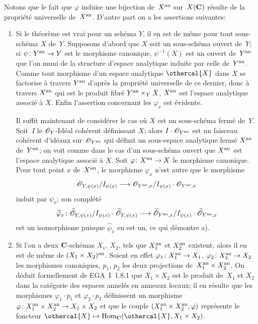 Notons que le fait que $\varphi$ induise une bijection de~$X^{\mathrm{an}}$ sur~$X(\mathbf{C})$ r\'esulte de la propri\'et\'e universelle de~$X^{\mathrm{an}}$.
D'autre part on a les assertions suivantes:

\begin{enumerate}
\item [a)] Si le th\'eor\`eme est vrai pour un sch\'ema $Y$, il
en est de m\^eme pour tout sous-sch\'ema $X$ de~$Y$. Supposons
d'abord que $X$ soit un sous-sch\'ema ouvert de~$Y$; si $\psi\colon
Y^\an\to Y$ est le morphisme canonique, $\psi^{-1}(X)$ est un ouvert
de~$Y^{\mathrm{an}}$ que l'on muni de la structure d'espace analytique induite
par celle de~$Y^{\mathrm{an}}$. Comme tout morphisme d'un espace analytique
$\othercal{X}$ dans $X$ se factorise \`a travers $Y^{\mathrm{an}}$ d'apr\`es la
propri\'et\'e universelle de ce dernier, donc \`a travers
$X^{\mathrm{an}}$ qui est le produit fibr\'e $Y^{\mathrm{an}}\times_Y X$, $X^{\mathrm{an}}$ est
l'espace analytique associ\'e \`a $X$. Enfin l'assertion
concernant les $\varphi_x$ est \'evidente.

Il suffit maintenant de consid\'erer le cas o\`u $X$ est un
sous-sch\'ema ferm\'e de~$Y$. Soit~$I$ le $\cal{O}_Y$-Id\'eal
coh\'erent d\'efinissant $X$; alors $I\cdot\cal{O}_{Y^\an}$ est un
faisceau coh\'erent d'id\'eaux sur~$\cal{O}_{Y^\an}$ qui
d\'efinit un sous-espace analytique ferm\'e $X^{\mathrm{an}}$ de~$Y^{\mathrm{an}}$; on
voit comme dans le cas d'un sous-sch\'ema ouvert que $X^{\mathrm{an}}$ est
l'espace analytique associ\'e \`a $X$. Soit $\varphi\colon
X^\an\to X$ le morphisme canonique. Pour tout point $x$ de~$X^{\mathrm{an}}$, le
morphisme $\varphi_x$ n'est autre que le morphisme
$$
\cal{O}_{Y,\psi(x)}/I_{\psi(x)}\to
\cal{O}_{Y^\an,x}/I_{\psi(x)}\cdot\cal{O}_{Y^\an,x}
$$
induit par $\psi_x$; son compl\'et\'e
$$
\widehat{\varphi}_x\colon
\widehat{\cal{O}}_{Y,\psi(x)}/I_{\psi(x)}\cdot\widehat{\cal{O}}_{Y,\psi(x)}
\to\widehat{\cal{O}}_{Y^\an,x}/I_{\psi(x)}\cdot\widehat{\cal{O}}_{Y^\an,x}
$$
est un isomorphisme puisque $\widehat\psi_x$ en est un, ce qui
d\'emontre a).

\item [b)] Si l'on a deux $\mathbf{C}$-sch\'emas $X_1$, $X_2$, tels que
$X_1^{\mathrm{an}}$ et $X_2^{\mathrm{an}}$ existent, alors il en est de m\^eme de
$(X_1\times X_2)^{\mathrm{an}}$. Soient en effet $\varphi_1\colon X_1^\an\to
X_1$, $\varphi_2\colon X_2^\an\to X_2$ les morphismes canoniques,
$p_1$, $p_2$ les deux projections de~$X_1^{\mathrm{an}}\times X_2^{\mathrm{an}}$. On
d\'eduit formellement de EGA~I~1.8.1 que $X_1\times X_2$ est le
produit de~$X_1$ et $X_2$ dans la cat\'egorie des espaces
annel\'es en anneaux locaux; il en r\'esulte que les morphismes
$\varphi_1\cdot p_1$ et $\varphi_2\cdot p_2$ d\'efinissent un
morphisme $\varphi\colon X_1^\an\times X_2^\an\to X_1\times X_2$ et
que le couple $(X_1^{\mathrm{an}}\times X_2^{\mathrm{an}},\varphi)$ repr\'esente le
foncteur $\othercal{X}\mto\Hom_\CC(\othercal{X},X_1\times X_2)$.


\end{enumerate}
